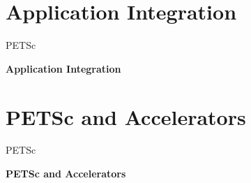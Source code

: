 



\section{Application Integration}
\begin{frame}{PETSc}
   \begin{center} \Large \textbf{Application Integration} \end{center}
\end{frame}








\section{PETSc and Accelerators}
\begin{frame}{PETSc}
   \begin{center} \Large \textbf{PETSc and Accelerators} \end{center}
\end{frame}













